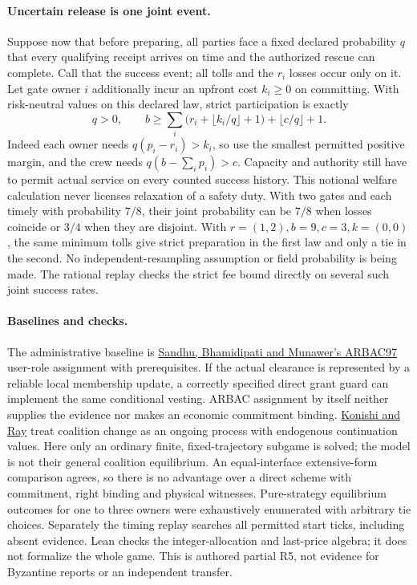 \documentclass[11pt]{article}
\begin{document}
\paragraph{Uncertain release is one joint event.}
Suppose now that before preparing, all parties face a fixed declared probability \(q\) that every qualifying receipt arrives on time and the authorized rescue can complete. Call that the success event; all tolls and the \(r_i\) losses occur only on it. Let gate owner \(i\) additionally incur an upfront cost \(k_i\geq0\) on committing. With risk-neutral values on this declared law, strict participation is exactly
\[
 q>0,\qquad b\geq \sum_i \bigl(r_i+\lfloor k_i/q\rfloor+1\bigr)
          +\lfloor c/q\rfloor+1 .
\]
Indeed each owner needs \(q(p_i-r_i)>k_i\), so use the smallest permitted positive margin, and the crew needs \(q(b-\sum_i p_i)>c\). Capacity and authority still have to permit actual service on every counted success history. This notional welfare calculation never licenses relaxation of a safety duty. With two gates and each timely with probability \(7/8\), their joint probability can be \(7/8\) when losses coincide or \(3/4\) when they are disjoint. With \(r=(1,2), b=9,c=3,k=(0,0)\), the same minimum tolls give strict preparation in the first law and only a tie in the second. No independent-resampling assumption or field probability is being made. The rational replay checks the strict fee bound directly on several such joint success rates.
\paragraph{Baselines and checks.}
The administrative baseline is \href{https://doi.org/10.1145/300830.300839}{Sandhu, Bhamidipati and Munawer's ARBAC97} user-role assignment with prerequisites. If the actual clearance is represented by a reliable local membership update, a correctly specified direct grant guard can implement the same conditional vesting. ARBAC assignment by itself neither supplies the evidence nor makes an economic commitment binding. \href{https://pages.nyu.edu/debraj/Papers/KonishiRay.pdf}{Konishi and Ray} treat coalition change as an ongoing process with endogenous continuation values. Here only an ordinary finite, fixed-trajectory subgame is solved; the model is not their general coalition equilibrium. An equal-interface extensive-form comparison agrees, so there is no advantage over a direct scheme with commitment, right binding and physical witnesses. Pure-strategy equilibrium outcomes for one to three owners were exhaustively enumerated with arbitrary tie choices. Separately the timing replay searches all permitted start ticks, including absent evidence. Lean checks the integer-allocation and last-price algebra; it does not formalize the whole game. This is authored partial R5, not evidence for Byzantine reports or an independent transfer.
\end{document}
